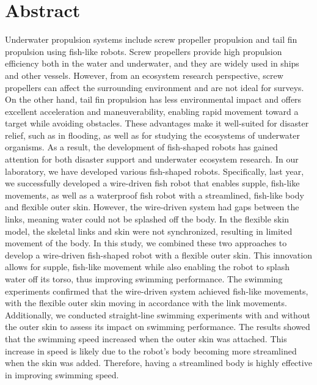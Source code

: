 \newpage
\section*{Abstract}
Underwater propulsion systems include screw propeller propulsion and tail fin propulsion using fish-like robots. Screw propellers provide high propulsion efficiency 
both in the water and underwater, and they are widely used in ships and other vessels. However, from an ecosystem research perspective, screw propellers can affect 
the surrounding environment and are not ideal for surveys. On the other hand, tail fin propulsion has less environmental impact and offers excellent acceleration 
and maneuverability, enabling rapid movement toward a target while avoiding obstacles. These advantages make it well-suited for disaster relief, such as in flooding, 
as well as for studying the ecosystems of underwater organisms.
As a result, the development of fish-shaped robots has gained attention for both disaster support and underwater ecosystem research. In our laboratory, we have developed 
various fish-shaped robots. Specifically, last year, we successfully developed a wire-driven fish robot that enables supple, fish-like movements, as well as a waterproof 
fish robot with a streamlined, fish-like body and flexible outer skin. However, the wire-driven system had gaps between the links, meaning water could not be splashed off
 the body. In the flexible skin model, the skeletal links and skin were not synchronized, resulting in limited movement of the body.
In this study, we combined these two approaches to develop a wire-driven fish-shaped robot with a flexible outer skin. This innovation allows for supple, fish-like movement 
while also enabling the robot to splash water off its torso, thus improving swimming performance. The swimming experiments confirmed that the wire-driven system achieved
 fish-like movements, with the flexible outer skin moving in accordance with the link movements. Additionally, we conducted straight-line swimming experiments with and 
 without the outer skin to assess its impact on swimming performance. The results showed that the swimming speed increased when the outer skin was attached. This increase 
 in speed is likely due to the robot’s body becoming more streamlined when the skin was added. Therefore, having a streamlined body is highly effective in improving swimming 
 speed.